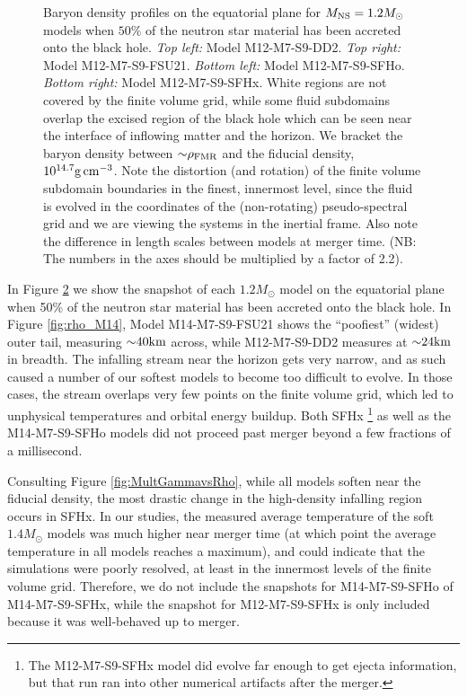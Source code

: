 \begin{figure}
\begin{subfigure}[b]{0.475\textwidth}
		\label{fig:rho_M12_SFHx}
	\end{subfigure}
	\caption[Density profiles on equatorial plane for $1.2 M_{\odot}$ models]{
		Baryon density profiles on the equatorial plane for $M_{\rm NS} = 1.2 M_{\odot}$ models when $50\%$ of the neutron star material has been accreted onto the black hole.
		\textit{Top left:} Model M12-M7-S9-DD2.
		\textit{Top right:} Model M12-M7-S9-FSU21.
		\textit{Bottom left:} Model M12-M7-S9-SFHo.
		\textit{Bottom right:} Model M12-M7-S9-SFHx.
		White regions are not covered by the finite volume grid, while some fluid subdomains overlap the excised region of the black hole which can be seen near the interface of inflowing matter and the horizon.  We bracket the baryon density between $\mathord{\sim} \rho_{\rm FMR}$ and the fiducial density, $10^{14.7} {\rm g\,cm^{-3}}$. Note the distortion (and rotation) of the finite volume subdomain boundaries in the finest, innermost level, since the fluid is evolved in the coordinates of the (non-rotating) pseudo-spectral grid and we are viewing the systems in the inertial frame.  Also note the difference in length scales between models at merger time. (NB: The numbers in the axes should be multiplied by a factor of 2.2).
	}
	\label{fig:rho_M12}
\end{figure}

In Figure \ref{fig:rho_M12} we show the snapshot of each $1.2 M_\odot$ model on the equatorial plane when 50\% of the neutron star material has been accreted onto the black hole.  
In Figure \ref{fig:rho_M14}, Model M14-M7-S9-FSU21 shows the ``poofiest'' (widest) outer tail, measuring $\mathord{\sim} 40 {\rm km}$ across, while M12-M7-S9-DD2 measures at $\mathord{\sim} 24 {\rm km}$ in breadth.  
The infalling stream near the horizon gets very narrow, and as such caused a number of our softest models to become too difficult to evolve.  
In those cases, the stream overlaps very few points on the finite volume grid, which led to unphysical temperatures and orbital energy buildup.  
Both SFHx
\footnote{
The M12-M7-S9-SFHx model did evolve far enough to get ejecta information, but that run ran into other numerical artifacts after the merger.
}
as well as the M14-M7-S9-SFHo models did not proceed past merger beyond a few fractions of a millisecond.

Consulting Figure \ref{fig:MultGammavsRho}, while all models soften near the fiducial density, the most drastic change in the high-density infalling region occurs in SFHx.  In our studies, the measured average temperature of the soft $1.4 M_\odot$ models was much higher near merger time (at which point the average temperature in all models reaches a maximum), and could indicate that the simulations were poorly resolved, at least in the innermost levels of the finite volume grid.  Therefore, we do not include the snapshots for M14-M7-S9-SFHo of M14-M7-S9-SFHx, while the snapshot for M12-M7-S9-SFHx is only included because it was well-behaved up to merger.

